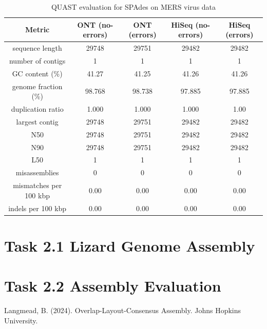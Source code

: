 \documentclass[12pt]{article}
\begin{document}
\begin{table}[h!]
\begin{center}
\begin{tabular}{ |c|c|c|c|c| }
    \hline
    Metric & ONT (no-errors) & ONT (errors) & HiSeq (no-errors) & HiSeq (errors) \\
    \hline
    sequence length & 29748 & 29751 & 29482 & 29482 \\
    number of contigs & 1 & 1 & 1 & 1 \\
    GC content (\%) & 41.27 & 41.25 & 41.26 & 41.26  \\
    genome fraction (\%) & 98.768 & 98.738 & 97.885  & 97.885 \\
    duplication ratio & 1.000 & 1.000 & 1.000 & 1.00 \\
    largest contig & 29748 & 29751 & 29482 & 29482 \\
    N50 & 29748 & 29751 & 29482 & 29482 \\
    N90 & 29748 & 29751 & 29482 & 29482 \\
    L50 & 1 & 1 & 1 & 1 \\
    misassemblies & 0 & 0 & 0 & 0 \\
    mismatches per 100 kbp & 0.00 & 0.00 & 0.00 & 0.00 \\
    indels per 100 kbp & 0.00 & 0.00 & 0.00 & 0.00 \\
    \hline
\end{tabular}
\end{center}
\caption{QUAST evaluation for SPAdes on MERS virus data}
\label{tab:quast_mers_spades}
\end{table}

\section{Task 2.1 Lizard Genome Assembly}

\section{Task 2.2 Assembly Evaluation}

\begin{thebibliography}{9}
Langmead, B. (2024). Overlap-Layout-Consensus Assembly. Johns Hopkins University.
\end{thebibliography}
\end{document}
